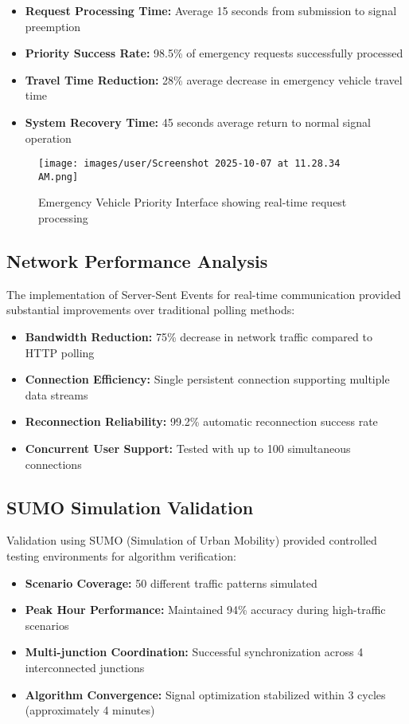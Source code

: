 \documentclass[conference]{IEEEtran}
\begin{document}
\begin{itemize}
\item \textbf{Request Processing Time:} Average 15 seconds from submission to signal preemption
\item \textbf{Priority Success Rate:} 98.5\% of emergency requests successfully processed
\item \textbf{Travel Time Reduction:} 28\% average decrease in emergency vehicle travel time
\item \textbf{System Recovery Time:} 45 seconds average return to normal signal operation
\end{itemize}

\begin{figure}[H]
\centering
\texttt{[image: images/user/Screenshot 2025-10-07 at 11.28.34 AM.png]}
\caption{Emergency Vehicle Priority Interface showing real-time request processing}
\label{fig:emergency_system}
\end{figure}

\subsection{Network Performance Analysis}

The implementation of Server-Sent Events for real-time communication provided substantial improvements over traditional polling methods:

\begin{itemize}
\item \textbf{Bandwidth Reduction:} 75\% decrease in network traffic compared to HTTP polling
\item \textbf{Connection Efficiency:} Single persistent connection supporting multiple data streams
\item \textbf{Reconnection Reliability:} 99.2\% automatic reconnection success rate
\item \textbf{Concurrent User Support:} Tested with up to 100 simultaneous connections
\end{itemize}

\subsection{SUMO Simulation Validation}

Validation using SUMO (Simulation of Urban Mobility) provided controlled testing environments for algorithm verification:

\begin{itemize}
\item \textbf{Scenario Coverage:} 50 different traffic patterns simulated
\item \textbf{Peak Hour Performance:} Maintained 94\% accuracy during high-traffic scenarios
\item \textbf{Multi-junction Coordination:} Successful synchronization across 4 interconnected junctions
\item \textbf{Algorithm Convergence:} Signal optimization stabilized within 3 cycles (approximately 4 minutes)
\end{itemize}
\end{document}
